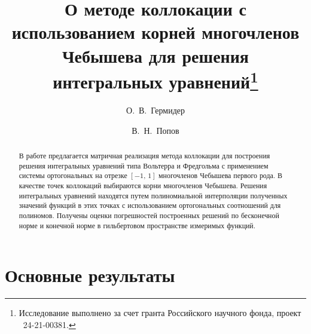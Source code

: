 \ifPDFTeX
\usepackage[T2A]{fontenc}
\usepackage[utf8]{inputenc} %
\usepackage[english,russian]{babel}
\fi

\usepackage{todonotes}

\usepackage[russian]{nla}


\fi

\title{О методе коллокации с использованием корней многочленов Чебышева для решения интегральных уравнений\thanks{Исследование выполнено за счет гранта Российского научного фонда, проект \textnumero~24-21-00381.}}
\author{О.~В.~Гермидер \and  В.~Н.~Попов
}


\maketitle

\begin{abstract}

В работе предлагается матричная реализация метода коллокации для построения решения интегральных уравнений типа Вольтерра и Фредгольма с применением системы ортогональных на отрезке $[-1,\,1]$ многочленов Чебышева первого рода. В качестве точек коллокаций выбираются корни многочленов Чебышева. Решения интегральных уравнений находятся путем полиномиальной интерполяции полученных значений функций в этих точках с использованием ортогональных соотношений для полиномов. Получены оценки погрешностей построенных решений по бесконечной норме и конечной норме в гильбертовом пространстве измеримых функций.

\end{abstract}

\section{Основные результаты} %


